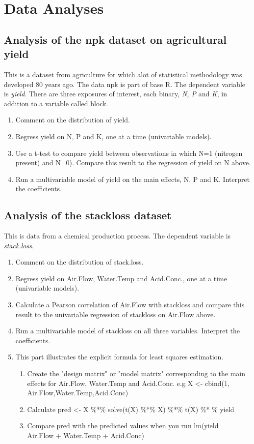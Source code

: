 \documentclass[11pt]{article}
\newenvironment{enum1}
{\begin{enumerate}
  \setlength{\itemsep}{1pt}
  \setlength{\parskip}{0pt}
  \setlength{\parsep}{0pt}
}{\end{enumerate}}
\begin{document}
\section{ Data Analyses}

\subsection{Analysis of the npk dataset on agricultural yield}

This is a dataset from agriculture for which alot of statistical methodology was developed 80 years ago.  The data npk is part of base R. The dependent variable is {\it yield}. There are three exposures of interest, each binary, {\it N, P} and {\it K}, in addition to a variable called block.

\begin{enum1}
\item Comment on the distribution of yield.
\item Regress yield on N, P and K, one at a time (univariable models). 
\item Use a t-test to compare yield between observations in which N=1 (nitrogen present) and N=0). Compare this result to the regression of yield on N above.
\item Run a multivariable model of yield on the main effects, N, P and K. Interpret the coefficients.
\end{enum1}

\subsection{Analysis of the stackloss dataset} 

This is data from a chemical production process. The dependent variable is {\it stack.loss}.

\begin{enum1}
\item Comment on the distribution of stack.loss.
\item Regress yield on Air.Flow, Water.Temp and Acid.Conc., one at a time (univariable models). 
\item Calculate a Pearson correlation of Air.Flow with stackloss and compare this result to the univariable regression of stackloss on Air.Flow above.
\item Run a multivariable model of stackloss on all three variables. Interpret the coefficients.
\item This part illustrates the explicit formula for least squares estimation.
\begin{enum1}
\item Create the "design matrix" or "model matrix" corresponding to the main effects for Air.Flow, Water.Temp and Acid.Conc. e.g X <- cbind(1, Air.Flow,Water.Temp,Acid.Conc)
\item Calculate pred <- X \%*\% solve(t(X) \%*\% X) \%*\% t(X) \%* \% yield
\item Compare pred with the predicted values when you run lm(yield ~ Air.Flow + Water.Temp + Acid.Conc)
\end{enum1}

\end{enum1}
\end{document}
